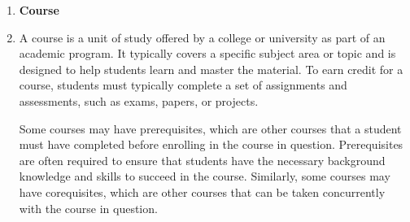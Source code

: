 \documentclass[12pt]{article}
\begin{document}
\begin{appendices}
\begin{enumerate}[label=(\roman*)]
    \item \textbf{Course}
    \item[] A course is a unit of study offered by a college or university as part of an academic program. It typically covers a specific subject area or topic and is designed to help students learn and master the material. To earn credit for a course, students must typically complete a set of assignments and assessments, such as exams, papers, or projects.

    Some courses may have prerequisites, which are other courses that a student must have completed before enrolling in the course in question. Prerequisites are often required to ensure that students have the necessary background knowledge and skills to succeed in the course. Similarly, some courses may have corequisites, which are other courses that can be taken concurrently with the course in question.
    

\end{enumerate}
\end{appendices}
\end{document}
